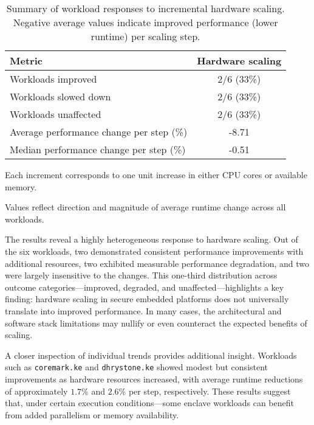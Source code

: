 \begin{table}[htbp]
\centering
\begin{threeparttable}
\caption{Summary of workload responses to incremental hardware scaling. Negative average values indicate improved performance (lower runtime) per scaling step.}
\label{tab:hardware-impact}
\begin{tabular}{@{}lc@{}}
\toprule
\textbf{Metric} & \textbf{Hardware scaling} \\
\midrule
Workloads improved                      & 2/6 (33\%) \\
Workloads slowed down                   & 2/6 (33\%) \\
Workloads unaffected                    & 2/6 (33\%) \\
Average performance change per step (\%) & -8.71     \\
Median performance change per step (\%)  & -0.51     \\
\bottomrule
\end{tabular}
\begin{tablenotes}
\footnotesize
\item Each increment corresponds to one unit increase in either CPU cores or available memory.
\item Values reflect direction and magnitude of average runtime change across all workloads.
\end{tablenotes}
\end{threeparttable}
\end{table}

The results reveal a highly heterogeneous response to hardware scaling. Out of the six workloads, two demonstrated consistent performance improvements with additional resources, two exhibited measurable performance degradation, and two were largely insensitive to the changes. This one-third distribution across outcome categories—improved, degraded, and unaffected—highlights a key finding: hardware scaling in secure embedded platforms does not universally translate into improved performance. In many cases, the architectural and software stack limitations may nullify or even counteract the expected benefits of scaling.

A closer inspection of individual trends provides additional insight. Workloads such as \texttt{coremark.ke} and \texttt{dhrystone.ke} showed modest but consistent improvements as hardware resources increased, with average runtime reductions of approximately $1.7\%$ and $2.6\%$ per step, respectively. These results suggest that, under certain execution conditions—some enclave workloads can benefit from added parallelism or memory availability.

